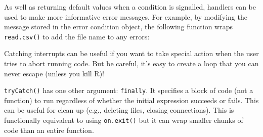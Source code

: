 As well as returning default values when a condition is signalled,
handlers can be used to make more informative error messages. For
example, by modifying the message stored in the error condition object,
the following function wraps \texttt{read.csv()} to add the file name to
any errors:

\begin{Shaded}
\begin{Highlighting}[]
\StringTok{ }
  \NormalTok{(} 
    \StringTok{ }\NormalTok{)}
  \NormalTok{\})}
\NormalTok{\}}
\NormalTok{(}\NormalTok{)}
\NormalTok{(}\NormalTok{)}
\end{Highlighting}
\end{Shaded}

Catching interrupts can be useful if you want to take special action
when the user tries to abort running code. But be careful, it's easy to
create a loop that you can never escape (unless you kill R)!

\begin{Shaded}
\begin{Highlighting}[]
\StringTok{ }
\StringTok{ }\NormalTok{) \{}
  \NormalTok{(\{}
    \NormalTok{(}\NormalTok{)}
    \NormalTok{(}\NormalTok{)}
  \NormalTok{\}, } 
    \NormalTok{(}\NormalTok{)}
    \StringTok{ }\StringTok{ }
  \NormalTok{\})}
\NormalTok{\}}
\end{Highlighting}
\end{Shaded}

\texttt{tryCatch()} has one other argument: \texttt{finally}. It
specifies a block of code (not a function) to run regardless of whether
the initial expression succeeds or fails. This can be useful for clean
up (e.g., deleting files, closing connections). This is functionally
equivalent to using \texttt{on.exit()} but it can wrap smaller chunks of
code than an entire function. 

